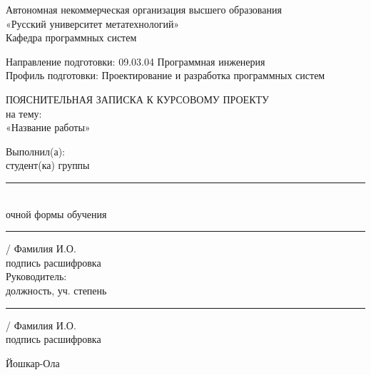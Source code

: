 \documentclass[12pt, a4paper]{article}
\renewcommand{\footnotesize}{\fontsize{10pt}{12pt}\selectfont}
\begin{document}
    \begin{titlepage}
        \begin{center}
            Автономная некоммерческая организация высшего образования \\
            «Русский университет метатехнологий» \\
            \vspace{1em}
            Кафедра программных систем
        \end{center}

        \vspace{2em}
        \noindent Направление подготовки: 09.03.04 Программная инженерия \\
        Профиль подготовки: Проектирование и разработка программных систем

        \vspace{5em}
        \begin{center}
            ПОЯСНИТЕЛЬНАЯ ЗАПИСКА К КУРСОВОМУ ПРОЕКТУ \\
            \vspace{1em}
            на тему: \\
            «Название работы»
        \end{center}

        \vspace{5em}
        \begin{flushright}
            \begin{minipage}{0.45\textwidth}
                Выполнил(а): \\
                студент(ка) группы \rule{2cm}{0.15mm} \\
                очной формы обучения \\
                \rule{3cm}{0.15mm} / Фамилия И.О. \\
                {\footnotesize подпись \hspace{1cm} расшифровка} \\

                \vspace{2em}
                Руководитель: \\
                должность, уч. степень \\
                \rule{3cm}{0.15mm} / Фамилия И.О. \\
                {\footnotesize подпись \hspace{1cm} расшифровка}
            \end{minipage}
        \end{flushright}

        \vfill
        \begin{center}
            Йошкар-Ола \\
            \the\year
        \end{center}
    \end{titlepage}
\end{document}
